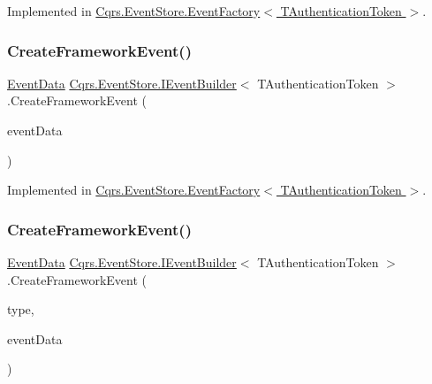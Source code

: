Implemented in \hyperlink{classCqrs_1_1EventStore_1_1EventFactory_adbcf9f3c67cfef3fe894e5fb53e8b800}{Cqrs.\+Event\+Store.\+Event\+Factory$<$ T\+Authentication\+Token $>$}.

\mbox{\label{interfaceCqrs_1_1EventStore_1_1IEventBuilder_a8ee9560f7b53c67b9946c3b0719eca96}} 
\subsubsection{\texorpdfstring{Create\+Framework\+Event()}{CreateFrameworkEvent()}\hspace{0.1cm}{\footnotesize\ttfamily [2/4]}}
{\footnotesize\ttfamily \hyperlink{classCqrs_1_1Events_1_1EventData}{Event\+Data} \hyperlink{interfaceCqrs_1_1EventStore_1_1IEventBuilder}{Cqrs.\+Event\+Store.\+I\+Event\+Builder}$<$ T\+Authentication\+Token $>$.Create\+Framework\+Event (\begin{DoxyParamCaption}\item[{\hyperlink{interfaceCqrs_1_1Events_1_1IEvent}{I\+Event}$<$ T\+Authentication\+Token $>$}]{event\+Data }\end{DoxyParamCaption})}



Implemented in \hyperlink{classCqrs_1_1EventStore_1_1EventFactory_ae514998a8368283f882014cc0db5b2b2}{Cqrs.\+Event\+Store.\+Event\+Factory$<$ T\+Authentication\+Token $>$}.

\mbox{\label{interfaceCqrs_1_1EventStore_1_1IEventBuilder_ab9608f44e12ce029fc98ad0eee53516a}} 
\subsubsection{\texorpdfstring{Create\+Framework\+Event()}{CreateFrameworkEvent()}\hspace{0.1cm}{\footnotesize\ttfamily [3/4]}}
{\footnotesize\ttfamily \hyperlink{classCqrs_1_1Events_1_1EventData}{Event\+Data} \hyperlink{interfaceCqrs_1_1EventStore_1_1IEventBuilder}{Cqrs.\+Event\+Store.\+I\+Event\+Builder}$<$ T\+Authentication\+Token $>$.Create\+Framework\+Event (\begin{DoxyParamCaption}\item[{string}]{type,  }\item[{\hyperlink{interfaceCqrs_1_1Events_1_1IEvent}{I\+Event}$<$ T\+Authentication\+Token $>$}]{event\+Data }\end{DoxyParamCaption})}



